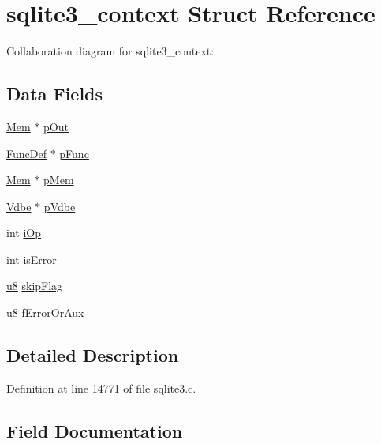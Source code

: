 \hypertarget{structsqlite3__context}{}\section{sqlite3\+\_\+context Struct Reference}
\label{structsqlite3__context}


Collaboration diagram for sqlite3\+\_\+context\+:
\subsection*{Data Fields}
\begin{DoxyCompactItemize}
\item 
\hyperlink{struct_mem}{Mem} $\ast$ \hyperlink{structsqlite3__context_ac4a03ce06815fb834cf607e3610c3023}{p\+Out}
\item 
\hyperlink{struct_func_def}{Func\+Def} $\ast$ \hyperlink{structsqlite3__context_a3859b9ebe9b2002c8ffb62f1a52e5c4d}{p\+Func}
\item 
\hyperlink{struct_mem}{Mem} $\ast$ \hyperlink{structsqlite3__context_a7635916f8de63cb13cfe0579469bb583}{p\+Mem}
\item 
\hyperlink{struct_vdbe}{Vdbe} $\ast$ \hyperlink{structsqlite3__context_ac73302f0c912cb7b3c9b1cea509e6077}{p\+Vdbe}
\item 
int \hyperlink{structsqlite3__context_a7d4638420dcef0fb9e0120bad40857e3}{i\+Op}
\item 
int \hyperlink{structsqlite3__context_ab70049122fc3811f1ca7ac2229839a26}{is\+Error}
\item 
\hyperlink{sqlite3_8c_a74a0f6424ae628af25f23f0a35f6ead3}{u8} \hyperlink{structsqlite3__context_ad40ba195f4593759f0397fa436e47c89}{skip\+Flag}
\item 
\hyperlink{sqlite3_8c_a74a0f6424ae628af25f23f0a35f6ead3}{u8} \hyperlink{structsqlite3__context_a8899b33d4af2040a45f2159eed439c0b}{f\+Error\+Or\+Aux}
\end{DoxyCompactItemize}


\subsection{Detailed Description}


Definition at line 14771 of file sqlite3.\+c.



\subsection{Field Documentation}
\hypertarget{structsqlite3__context_a8899b33d4af2040a45f2159eed439c0b}{}
